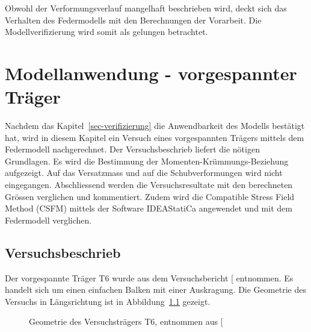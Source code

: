 \documentclass[
  11pt,
  letterpaper,
]{scrreprt}
\begin{document}
Obwohl der Verformungsverlauf mangelhaft beschrieben wird, deckt sich
das Verhalten des Federmodells mit den Berechnungen der Vorarbeit. Die
Modellverifizierung wird somit als gelungen betrachtet.


\chapter{Modellanwendung - vorgespannter
Träger}\label{modellanwendung---vorgespannter-truxe4ger}

Nachdem das Kapitel~\ref{sec-verifizierung} die Anwendbarkeit des
Modells bestätigt hat, wird in diesem Kapitel ein Versuch eines
vorgespannten Trägers mittels dem Federmodell nachgerechnet. Der
Versuchsbeschrieb liefert die nötigen Grundlagen. Es wird die Bestimmung
der Momenten-Krümmungs-Beziehung aufgezeigt. Auf das Versatzmass und auf
die Schubverformungen wird nicht eingegangen. Abschliessend werden die
Versuchsresultate mit den berechneten Grössen verglichen und
kommentiert. Zudem wird die Compatible Stress Field Method (CSFM)
mittels der Software IDEAStatiCa angewendet und mit dem Federmodell
verglichen.

\section{Versuchsbeschrieb}\label{versuchsbeschrieb-2}

Der vorgespannte Träger T6 wurde aus dem Versuchsbericht
{[}\citeproc{ref-sigrist_versuche_1993}{5}{]} entnommen. Es handelt sich
um einen einfachen Balken mit einer Auskragung. Die Geometrie des
Versuchs in Längsrichtung ist in Abbildung~\ref{fig-geometrie_t6}
gezeigt.

\begin{figure}[H]


\caption{\label{fig-geometrie_t6}Geometrie des Versuchsträgers T6,
entnommen aus {[}\citeproc{ref-sigrist_versuche_1993}{5}{]}}

\end{figure}%
\end{document}
